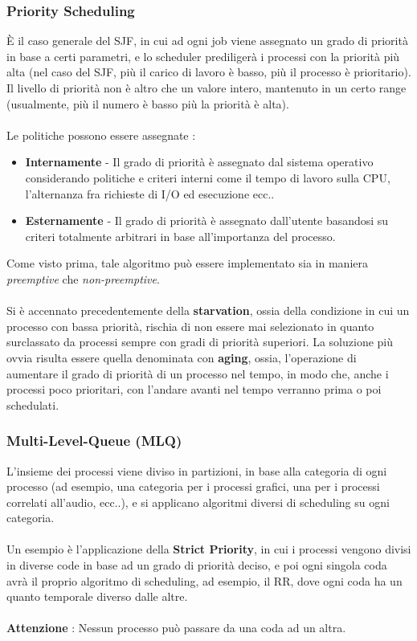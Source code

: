 \documentclass[12pt, letterpaper]{article}
\newcommand{\acc}{\\\hphantom{}\\}
\begin{document}
\subsubsection{Priority Scheduling} 
È il caso generale del SJF, in cui ad ogni job viene assegnato un 
grado di priorità in base a certi parametri, e lo scheduler 
prediligerà i processi con la priorità più alta (nel caso del SJF, 
più il carico di lavoro è basso, più il processo è prioritario). Il livello 
di priorità non è altro che un valore intero, mantenuto in un 
certo range (usualmente, più il numero è basso più la priorità 
è alta).\acc Le politiche possono essere assegnate :\begin{itemize}
    \item \textbf{Internamente} - Il grado di priorità è assegnato 
    dal sistema operativo considerando politiche e criteri interni come il tempo di lavoro 
    sulla CPU, l'alternanza fra richieste di I/O ed esecuzione ecc..
    \item \textbf{Esternamente} - Il grado di priorità è assegnato dall'utente 
    basandosi su criteri totalmente arbitrari in base all'importanza 
    del processo.
\end{itemize}
Come visto prima, tale algoritmo può essere implementato 
sia in maniera \textit{preemptive} che \textit{non-preemptive}.\acc
Si è accennato precedentemente della \textbf{starvation}, ossia della condizione 
in cui un processo con bassa priorità, rischia di non essere mai selezionato in 
quanto surclassato da processi sempre con gradi di priorità superiori. La 
soluzione più ovvia risulta essere quella denominata con \textbf{aging}, ossia, 
l'operazione di aumentare il grado di priorità di un processo nel tempo, in modo che,
anche i processi poco prioritari, con l'andare avanti nel tempo verranno prima o poi 
schedulati.
\subsubsection{Multi-Level-Queue (MLQ)}
L'insieme dei processi viene diviso in partizioni, in base alla categoria 
di ogni processo (ad esempio, una categoria per i processi grafici, una per i processi 
 correlati all'audio, ecc..), e si applicano algoritmi diversi di scheduling 
 su ogni categoria. \acc Un esempio è l'applicazione della \textbf{Strict Priority}, 
 in cui i processi vengono divisi in diverse code in base ad un grado di priorità 
 deciso, e poi ogni singola coda avrà il proprio algoritmo di scheduling, ad esempio, 
 il RR, dove ogni coda ha un quanto temporale diverso dalle altre.
  \acc \textbf{Attenzione} : Nessun processo può passare da una coda ad un altra.
  \begin{figure}[h]
\end{figure}\\
\end{document}
